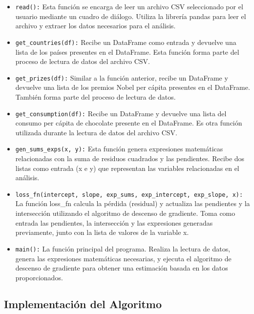 \documentclass[12pt, a4paper]{article} %
\begin{document}
\begin{itemize}
	\item \texttt{read():} Esta función se encarga de leer un archivo CSV seleccionado por el usuario mediante un cuadro de diálogo. Utiliza la librería pandas para leer el archivo y extraer los datos necesarios para el análisis.

	\item \texttt{get\_countries(df):} Recibe un DataFrame como entrada y devuelve una lista de los países presentes en el DataFrame. Esta función forma parte del proceso de lectura de datos del archivo CSV.

	\item \texttt{get\_prizes(df):} Similar a la función anterior, recibe un DataFrame y devuelve una lista de los premios Nobel per cápita presentes en el DataFrame. También forma parte del proceso de lectura de datos.

	\item \texttt{get\_consumption(df):} Recibe un DataFrame y devuelve una lista del consumo per cápita de chocolate presente en el DataFrame. Es otra función utilizada durante la lectura de datos del archivo CSV.

	\item \texttt{gen\_sums\_exps(x, y):} Esta función genera expresiones matemáticas relacionadas con la suma de residuos cuadrados y las pendientes. Recibe dos listas como entrada (x e y) que representan las variables relacionadas en el análisis.

	\item \texttt{loss\_fn(intercept, slope, exp\_sums, exp\_intercept, exp\_slope, x):} La función loss\_fn calcula la pérdida (residual) y actualiza las pendientes y la intersección utilizando el algoritmo de descenso de gradiente. Toma como entrada las pendientes, la intersección y las expresiones generadas previamente, junto con la lista de valores de la variable x.

	\item \texttt{main():} La función principal del programa. Realiza la lectura de datos, genera las expresiones matemáticas necesarias, y ejecuta el algoritmo de descenso de gradiente para obtener una estimación basada en los datos proporcionados.
\end{itemize}

\subsection{Implementación del Algoritmo}
\end{document}
